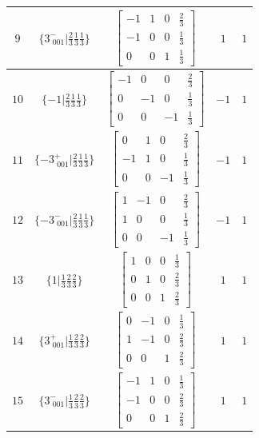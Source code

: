 \documentclass[fleqn,8pt]{jsarticle}
\begin{document}
\begin{longtable}{ccccc}
$ 9 $ & $ \{3^{-}_{\,\,001}|\frac{2}{3} \frac{1}{3} \frac{1}{3}\} $ & $ \begin{bmatrix} -1 & 1 & 0 & \frac{2}{3} \\ -1 & 0 & 0 & \frac{1}{3} \\ 0 & 0 & 1 & \frac{1}{3} \end{bmatrix} $ & $ 1 $ & $ 1 $ \\ \hline
$ 10 $ & $ \{-1|\frac{2}{3} \frac{1}{3} \frac{1}{3}\} $ & $ \begin{bmatrix} -1 & 0 & 0 & \frac{2}{3} \\ 0 & -1 & 0 & \frac{1}{3} \\ 0 & 0 & -1 & \frac{1}{3} \end{bmatrix} $ & $ -1 $ & $ 1 $ \\ \hline
$ 11 $ & $ \{-3^{+}_{\,\,001}|\frac{2}{3} \frac{1}{3} \frac{1}{3}\} $ & $ \begin{bmatrix} 0 & 1 & 0 & \frac{2}{3} \\ -1 & 1 & 0 & \frac{1}{3} \\ 0 & 0 & -1 & \frac{1}{3} \end{bmatrix} $ & $ -1 $ & $ 1 $ \\ \hline
$ 12 $ & $ \{-3^{-}_{\,\,001}|\frac{2}{3} \frac{1}{3} \frac{1}{3}\} $ & $ \begin{bmatrix} 1 & -1 & 0 & \frac{2}{3} \\ 1 & 0 & 0 & \frac{1}{3} \\ 0 & 0 & -1 & \frac{1}{3} \end{bmatrix} $ & $ -1 $ & $ 1 $ \\ \hline
$ 13 $ & $ \{1|\frac{1}{3} \frac{2}{3} \frac{2}{3}\} $ & $ \begin{bmatrix} 1 & 0 & 0 & \frac{1}{3} \\ 0 & 1 & 0 & \frac{2}{3} \\ 0 & 0 & 1 & \frac{2}{3} \end{bmatrix} $ & $ 1 $ & $ 1 $ \\ \hline
$ 14 $ & $ \{3^{+}_{\,\,001}|\frac{1}{3} \frac{2}{3} \frac{2}{3}\} $ & $ \begin{bmatrix} 0 & -1 & 0 & \frac{1}{3} \\ 1 & -1 & 0 & \frac{2}{3} \\ 0 & 0 & 1 & \frac{2}{3} \end{bmatrix} $ & $ 1 $ & $ 1 $ \\ \hline
$ 15 $ & $ \{3^{-}_{\,\,001}|\frac{1}{3} \frac{2}{3} \frac{2}{3}\} $ & $ \begin{bmatrix} -1 & 1 & 0 & \frac{1}{3} \\ -1 & 0 & 0 & \frac{2}{3} \\ 0 & 0 & 1 & \frac{2}{3} \end{bmatrix} $ & $ 1 $ & $ 1 $ \\ \hline

\end{longtable}
\end{document}

